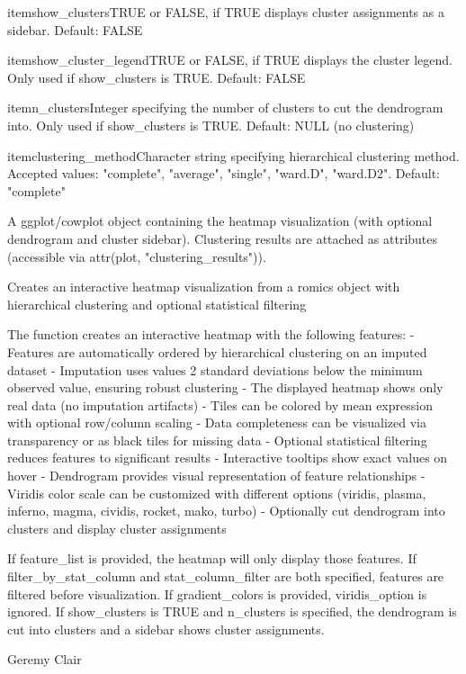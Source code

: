 \documentclass[a4paper]{book}
\begin{document}
\begin{Arguments}
\begin{ldescription}
\bsl{}itemshow\_clustersTRUE or FALSE, if TRUE displays cluster assignments as a sidebar. Default: FALSE

\bsl{}itemshow\_cluster\_legendTRUE or FALSE, if TRUE displays the cluster legend. Only used if show\_clusters is TRUE. Default: FALSE

\bsl{}itemn\_clustersInteger specifying the number of clusters to cut the dendrogram into. Only used if show\_clusters is TRUE. Default: NULL (no clustering)

\bsl{}itemclustering\_methodCharacter string specifying hierarchical clustering method. Accepted values: "complete", "average", "single", "ward.D", "ward.D2". Default: "complete"

\end{ldescription}

A ggplot/cowplot object containing the heatmap visualization (with optional dendrogram and cluster sidebar).
Clustering results are attached as attributes (accessible via attr(plot, "clustering\_results")).


Creates an interactive heatmap visualization from a romics object with hierarchical clustering and optional statistical filtering


The function creates an interactive heatmap with the following features:
- Features are automatically ordered by hierarchical clustering on an imputed dataset
- Imputation uses values 2 standard deviations below the minimum observed value, ensuring robust clustering
- The displayed heatmap shows only real data (no imputation artifacts)
- Tiles can be colored by mean expression with optional row/column scaling
- Data completeness can be visualized via transparency or as black tiles for missing data
- Optional statistical filtering reduces features to significant results
- Interactive tooltips show exact values on hover
- Dendrogram provides visual representation of feature relationships
- Viridis color scale can be customized with different options (viridis, plasma, inferno, magma, cividis, rocket, mako, turbo)
- Optionally cut dendrogram into clusters and display cluster assignments

If feature\_list is provided, the heatmap will only display those features.
If filter\_by\_stat\_column and stat\_column\_filter are both specified, features are filtered before visualization.
If gradient\_colors is provided, viridis\_option is ignored.
If show\_clusters is TRUE and n\_clusters is specified, the dendrogram is cut into clusters and a sidebar shows cluster assignments.


Geremy Clair

\end{Arguments}
\end{document}
